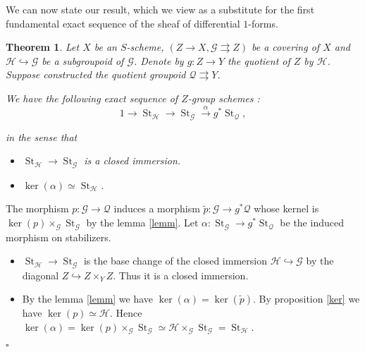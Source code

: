 \documentclass{amsart}
\newenvironment{demo}{{\flushleft \bf Proof~:}}{\hfill $\square$ \vspace{5mm}}
\newtheorem{theo}{Theorem}[section]
\theoremstyle{definition}
\theoremstyle{remark}
\begin{document}
We can now state our result, which we view as a substitute for the first fundamental exact sequence of the sheaf of differential $1$-forms. 
\begin{theo}
\label{exactgroup}
Let $X$ be an $S$-scheme, $(Z {\longrightarrow} X, {{\mathcal G}} {\rightrightarrows} Z)$ be a covering of $X$ and ${{\mathcal H}} {\hookrightarrow} {{\mathcal G}}$ be a subgroupoid of ${{\mathcal G}}$. Denote by $g : Z {\longrightarrow} Y$ the quotient of $Z$ by ${{\mathcal H}}$. Suppose constructed the quotient groupoid ${{\mathcal Q}} {\rightrightarrows} Y$.

We have the following exact sequence of $Z$-group schemes : \[ 1 {\longrightarrow} \operatorname{St}_{{\mathcal H}} {\longrightarrow} \operatorname{St}_{{\mathcal G}} \stackrel{\alpha}{\longrightarrow} g^*\operatorname{St}_{{\mathcal Q}}, \] 

in the sense that 

\begin{itemize}

\item[(i)] $\operatorname{St}_{{\mathcal H}} {\longrightarrow} \operatorname{St}_{{\mathcal G}}$ is a closed immersion.

\item[(ii)] $\ker(\alpha) \simeq \operatorname{St}_{{\mathcal H}}$.
\end{itemize}

\end{theo}

\begin{demo}
The morphism $p : {{\mathcal G}} {\longrightarrow} {{\mathcal Q}}$ induces a morphism $\tilde{p} : {{\mathcal G}} {\longrightarrow} g^*{{\mathcal Q}}$ whose kernel is $\ker(p) \times_{{\mathcal G}} \operatorname{St}_{{\mathcal G}}$ by the lemma \ref{lemm}. Let $\alpha : \operatorname{St}_{{\mathcal G}} {\longrightarrow} g^*\operatorname{St}_{{\mathcal Q}}$ be the induced morphism on stabilizers. 
 

\begin{itemize}

\item[(i)] $\operatorname{St}_{{\mathcal H}} {\longrightarrow} \operatorname{St}_{{\mathcal G}}$ is the base change of the closed immersion ${{\mathcal H}} {\hookrightarrow} {{\mathcal G}}$ by the diagonal $Z {\hookrightarrow} Z \times_Y Z$. Thus it is a closed immersion.

\item[(ii)] By the lemma \ref{lemm} we have $\ker(\alpha) = \ker(\tilde{p})$. By proposition \ref{ker} we have $\ker(p) \simeq {{\mathcal H}}$. Hence $\ker(\alpha) = \ker(p) \times_{{\mathcal G}} \operatorname{St}_{{\mathcal G}} \simeq {{\mathcal H}} \times_{{\mathcal G}} \operatorname{St}_{{\mathcal G}} = \operatorname{St}_{{\mathcal H}}$.

\end{itemize}

\end{demo}
\end{document}
